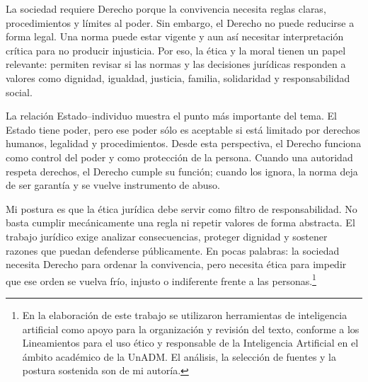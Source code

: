 \documentclass[
	spanish,
	letterpaper, oneside
]{article}
\begin{document}
La sociedad requiere Derecho porque la convivencia necesita reglas claras, procedimientos y límites al poder. Sin embargo, el Derecho no puede reducirse a forma legal. Una norma puede estar vigente y aun así necesitar interpretación crítica para no producir injusticia. Por eso, la ética y la moral tienen un papel relevante: permiten revisar si las normas y las decisiones jurídicas responden a valores como dignidad, igualdad, justicia, familia, solidaridad y responsabilidad social.

La relación Estado--individuo muestra el punto más importante del tema. El Estado tiene poder, pero ese poder sólo es aceptable si está limitado por derechos humanos, legalidad y procedimientos. Desde esta perspectiva, el Derecho funciona como control del poder y como protección de la persona. Cuando una autoridad respeta derechos, el Derecho cumple su función; cuando los ignora, la norma deja de ser garantía y se vuelve instrumento de abuso.

Mi postura es que la ética jurídica debe servir como filtro de responsabilidad. No basta cumplir mecánicamente una regla ni repetir valores de forma abstracta. El trabajo jurídico exige analizar consecuencias, proteger dignidad y sostener razones que puedan defenderse públicamente. En pocas palabras: la sociedad necesita Derecho para ordenar la convivencia, pero necesita ética para impedir que ese orden se vuelva frío, injusto o indiferente frente a las personas.\footnote{En la elaboración de este trabajo se utilizaron herramientas de inteligencia artificial como apoyo para la organización y revisión del texto, conforme a los Lineamientos para el uso ético y responsable de la Inteligencia Artificial en el ámbito académico de la UnADM. El análisis, la selección de fuentes y la postura sostenida son de mi autoría.}



\end{document}
